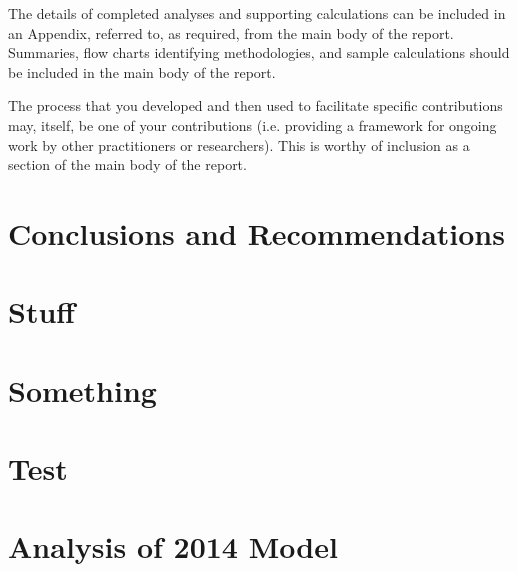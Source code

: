 \documentclass[]{article}
\begin{document}
The details of completed analyses and supporting calculations can be included in an Appendix, referred to, as required, from the main body of the report.  Summaries, flow charts identifying methodologies, and sample calculations should be included in the main body of the report.

The process that you developed and then used to facilitate specific contributions may, itself, be one of your contributions (i.e. providing a framework for ongoing work by other practitioners or researchers).  This is worthy of inclusion as a section of the main body of the report.
\color{black}

\section{Conclusions and Recommendations}


\newpage
\appendix

\newpage

\section{Stuff}


\newpage
\section{Something}


\section{Test}


\section{Analysis of 2014 Model}
	
	


\end{document}
